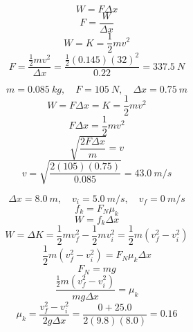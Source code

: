 \documentclass[11pt]{homework}
\begin{document}
\setcounter{questionCounter}{58}
\question
\[
    W = F \Delta x
\]
\[
    F = \frac{W}{\Delta x}
\]
\[
    W = K = \frac{1}{2}mv^2 
\]
\[
    F = \frac{\frac{1}{2}mv^2}{\Delta x} = \frac{\frac{1}{2}(0.145)(32)^2}{0.22} = \boxed{\qty{337.5}{N}}
\]

\question
\[
    m = \qty{0.085}{kg}, \quad F = \qty{105}{N}, \quad \Delta x = \qty{0.75}{m}
\]\[
    W = F \Delta x = K = \frac{1}{2}mv^2
\]\[
F \Delta x = \frac{1}{2}mv^2 
\]\[
\sqrt{\frac{2F\Delta x}{m}} = v 
\]\[
v = \sqrt{\frac{2(105)(0.75)}{0.085}} = \boxed{\qty{43.0}{m/s}}
\]

\setcounter{questionCounter}{64}
\question
\[
    \Delta x = \qty{8.0}{m}, \quad v_i = \qty{5.0}{m/s}, \quad v_f = \qty{0}{m/s}
\]\[
f_k = F_N\mu_k
\]\[
W = f_k \Delta x
\]\[
W=\Delta K=\frac{1}{2}mv_{f}^2-\frac{1}{2}mv^2_{i} = \frac{1}{2}m(v_f^2 - v_i^2)
\]\[
\frac{1}{2}m(v_f^2-v_i^2) = F_N\mu_k \Delta x
\]\[
F_N = mg
\]\[
\frac{\frac{1}{2}m(v_f^2-v_i^2)}{mg\Delta x} = \mu_k
\]\[
\mu_k = \frac{v_f^2-v_i^2}{2g\Delta x} = \frac{0+25.0}{2(9.8)(8.0)} = \boxed{0.16}
\]
\end{document}
